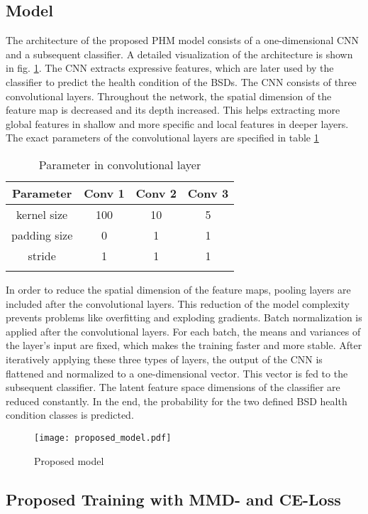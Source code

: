 \subsection{Model}
\label{sec:model}
The architecture of the proposed PHM model consists of a one-dimensional CNN and a subsequent classifier. A detailed visualization of the architecture is shown in fig. \ref{fig:proposed_model}. The CNN extracts expressive features, which are later used by the classifier to predict the health condition of the BSDs. The CNN consists of three convolutional layers. Throughout the network, the spatial dimension of the feature map is decreased and its depth increased. This helps extracting more global features in shallow and more specific and local features in deeper layers. The exact parameters of the convolutional layers are specified in table \ref{tab:parameter_conv} 
\begin{longtable}{c c c c} 
\toprule
Parameter & Conv 1 & Conv 2 & Conv 3 \\
\midrule
kernel size & 100 & 10 & 5 \\

padding size & 0 & 1 & 1 \\

stride & 1 & 1 & 1 \\
\bottomrule
\caption {Parameter in convolutional layer}
\label {tab:parameter_conv}
\end{longtable}

In order to reduce the spatial dimension of the feature maps, pooling layers are included after the convolutional layers. This reduction of the model complexity prevents problems like overfitting and exploding gradients. Batch normalization is applied after the convolutional layers. For each batch, the means and variances of the layer's input are fixed, which makes the training faster and more stable. After iteratively applying these three types of layers, the output of the CNN is flattened and normalized to a one-dimensional vector. This vector is fed to the subsequent classifier. The latent feature space dimensions of the classifier are reduced constantly. In the end, the probability for the two defined BSD health condition classes is predicted.


\begin{figure}[H]
  \centering
  \texttt{[image: proposed\_model.pdf]}
  \caption {Proposed model} \label{fig:proposed_model}
\end{figure}


\subsection{Proposed Training with MMD- and CE-Loss} \label{sec:Proposed_training}

